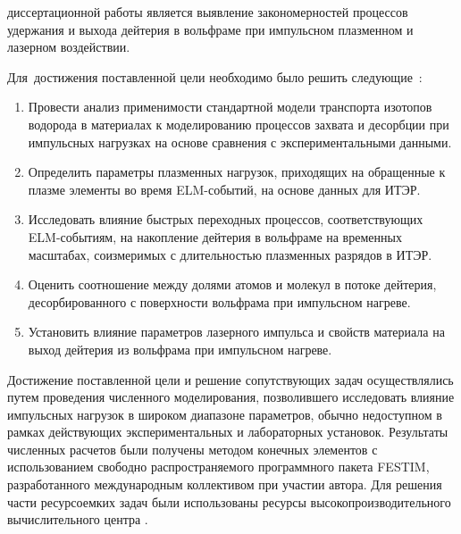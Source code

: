 {\aim} диссертационной работы является выявление закономерностей процессов удержания и выхода дейтерия в вольфраме при импульсном плазменном и лазерном воздействии.

Для~достижения поставленной цели необходимо было решить следующие~{\tasks}:
\begin{enumerate}[beginpenalty=10000] %
    \item Провести анализ применимости стандартной модели транспорта изотопов водорода в материалах к моделированию процессов захвата и десорбции при импульсных нагрузках на основе сравнения с экспериментальными данными.
    \item Определить параметры плазменных нагрузок, приходящих на обращенные к плазме элементы во время ELM-событий, на основе данных для ИТЭР.
    \item Исследовать влияние быстрых переходных процессов, соответствующих ELM-событиям, на накопление дейтерия в вольфраме на временных масштабах, соизмеримых с длительностью плазменных разрядов в ИТЭР.
    \item Оценить соотношение между долями атомов и молекул в потоке дейтерия, десорбированного с поверхности вольфрама при импульсном нагреве.
    \item Установить влияние параметров лазерного импульса и свойств материала на выход дейтерия из вольфрама при импульсном нагреве.
\end{enumerate}

{\methods} Достижение поставленной цели и решение сопутствующих задач осуществлялись путем проведения численного моделирования, позволившего исследовать влияние импульсных нагрузок в широком диапазоне параметров, обычно недоступном в рамках действующих экспериментальных и лабораторных установок. Результаты численных расчетов были получены методом конечных элементов с использованием свободно распространяемого программного пакета FESTIM, разработанного международным коллективом при участии автора. Для решения части ресурсоемких задач были использованы ресурсы высокопроизводительного вычислительного центра \thesisOrganizationShort.

